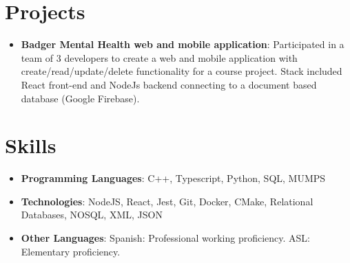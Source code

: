 \documentclass[letterpaper,11pt]{article}
\makeatletter
\newcommand{\resumeItem}[2]{
  \item\small{
    \textbf{#1}{: #2 \vspace{-2pt}}
  }
}
\newcommand{\resumeSubSubheading}[2]{
    \begin{tabular*}{0.97\textwidth}{l@{\extracolsep{\fill}}r}
      \textit{\small#1} & \textit{\small #2} \\
    \end{tabular*}\vspace{-5pt}
}
\newcommand{\resumeSubItem}[2]{\resumeItem{#1}{#2}\vspace{-4pt}}
\newcommand{\resumeSubHeadingListStart}{\begin{itemize}[leftmargin=*]}
\newcommand{\resumeSubHeadingListEnd}{\end{itemize}}
\newcommand{\resumeItemListStart}{\begin{itemize}}
\newcommand{\resumeItemListEnd}{\end{itemize}\vspace{-5pt}}
\makeatother
\begin{document}

\section{Projects}
  \resumeSubHeadingListStart
    \resumeSubItem{Badger Mental Health web and mobile application}
      {Participated in a team of 3 developers to create a web and mobile application with create/read/update/delete functionality for a course project. Stack included React front-end and NodeJs backend connecting to a document based database (Google Firebase).}
  \resumeSubHeadingListEnd

%

\section{Skills}
  \resumeItemListStart
    \resumeItem{Programming Languages}{C++, Typescript, Python, SQL, MUMPS}
    \resumeItem{Technologies}{NodeJS, React, Jest, Git, Docker, CMake, Relational Databases, NOSQL, XML, JSON}
    \resumeItem{Other Languages}{Spanish: Professional working proficiency. ASL: Elementary proficiency.}
  \resumeItemListEnd

\end{document}
